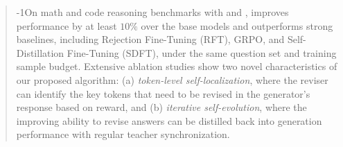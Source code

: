 \begin{abstract}
\looseness-1On math and code reasoning benchmarks with \qwen{} and \olmo{}, \ours{}{} improves performance by at least $10\%$ over the base models and outperforms strong baselines, including Rejection Fine-Tuning (RFT), GRPO, and Self-Distillation Fine-Tuning (SDFT), under the same question set and training sample budget.
Extensive ablation studies show two novel characteristics of our proposed algorithm: (a) \emph{token-level self-localization}, where the reviser can identify the key tokens that need to be revised in the generator's response based on reward,  and (b) \emph{iterative self-evolution}, where the improving ability to revise answers can be distilled back into generation performance with regular teacher synchronization. 









\end{abstract}
